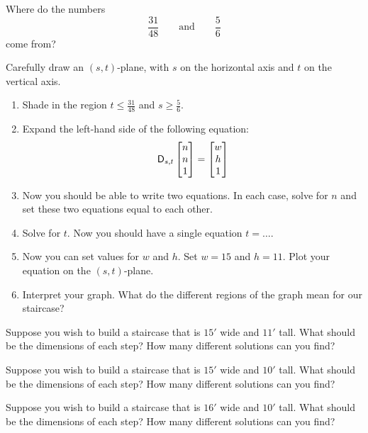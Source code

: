 \begin{prob}
Where do the numbers 
\[
\frac{31}{48}\qquad\text{and}\qquad \frac{5}{6}
\]
come from?
\end{prob}


\begin{prob}
Carefully draw an $(s,t)$-plane, with $s$ on the horizontal axis and $t$ on the vertical axis. 
\begin{enumerate}
\item Shade in the region  $t\le \frac{31}{48}$ and $s\ge \frac{5}{6}$.
\item Expand the left-hand side of the following equation: 
\[
\mathsf{D}_{s,t}
\begin{bmatrix}
n \\ n \\ 1
\end{bmatrix}
= 
\begin{bmatrix}
w \\
h \\
1
\end{bmatrix}
\]
\item Now you should be able to write two equations. In each case, solve for $n$ and set these two equations equal to each other. 
\item Solve for $t$. Now you should have a single equation $t= \dots$.
\item Now you can set values for $w$ and $h$. Set $w = 15$ and $h=11$. Plot your equation on the $(s,t)$-plane.
\item Interpret your graph.  What do the different regions of the graph mean for our staircase?
\end{enumerate}
\end{prob}


\begin{prob}\label{P:Stair}
Suppose you wish to build a staircase that is $15'$ wide and $11'$
tall. What should be the dimensions of each step? How many different
solutions can you find?
\end{prob}

\begin{prob}
Suppose you wish to build a staircase that is $15'$ wide and $10'$
tall. What should be the dimensions of each step? How many different
solutions can you find?
\end{prob}

\begin{prob}
Suppose you wish to build a staircase that is $16'$ wide and $10'$
tall. What should be the dimensions of each step? How many different
solutions can you find?
\end{prob}


